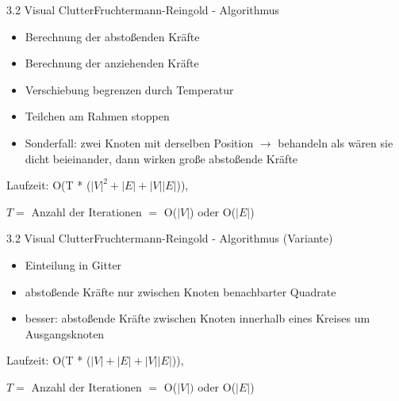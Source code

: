 \documentclass[%
11pt,a4paper,xcolor={usenames,dvipsnames}]{beamer}
\begin{document}
    \begin{frame}{3.2 Visual Clutter}{Fruchtermann-Reingold - Algorithmus}
        \begin{itemize}
        	\item Berechnung der abstoßenden Kräfte
	        \item Berechnung der anziehenden Kräfte
	        \item Verschiebung begrenzen durch Temperatur
	        \item Teilchen am Rahmen stoppen
	        \item Sonderfall: zwei Knoten mit derselben Position $\rightarrow$ behandeln als wären sie dicht beieinander, dann wirken große abstoßende Kräfte
    	\end{itemize}

    	Laufzeit: O(T * ($|V|^2 + |E| + |V||E|$)),
    	
    	 $T =$ Anzahl der Iterationen $=$ O($|V|$) oder O($|E|$)
    \end{frame}

    \begin{frame}{3.2 Visual Clutter}{Fruchtermann-Reingold - Algorithmus (Variante)}
        \begin{itemize}
        	\item Einteilung in Gitter
        	\item abstoßende Kräfte nur zwischen Knoten benachbarter Quadrate
        	\item besser: abstoßende Kräfte zwischen Knoten innerhalb eines Kreises um Ausgangsknoten
    	\end{itemize}

    	Laufzeit: O(T * ($|V| + |E| + |V||E|$)),
    	
    	$T =$ Anzahl der Iterationen $=$ O($|V|)$ oder O($|E|$)
    \end{frame}
\end{document}
